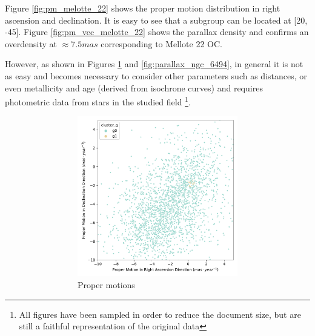 \documentclass[11pt, a4paper, english]{book}
\begin{document}
Figure \ref{fig:pm_melotte_22} shows the proper motion distribution in right ascension and declination.
It is easy to see that a subgroup can be located at [20, -45].
Figure \ref{fig:pm_vec_melotte_22} shows the parallax density and confirms an overdensity at $\approx 7.5 mas$ corresponding to Mellote 22 OC.

However, as shown in Figures \ref{fig:pm_ngc_6494} and \ref{fig:parallax_ngc_6494}, in general it is not as easy and
becomes necessary to consider other parameters such as distances, or even metallicity and age (derived from isochrone curves)
and requires photometric data from stars in the studied field
\footnote{All figures have been sampled in order to reduce the document size, but are still a faithful representation of the original data}.

\begin{figure}[htbp]
  \centering
  \begin{subfigure}{0.9\textwidth}
    \centering
    \begin{subfigure}[t]{0.45\textwidth}
      \centering
      \includegraphics[width=\textwidth]{../figures/pm_ngc_6494.pdf}
      \caption{Proper motions}
      \label{fig:pm_ngc_6494}
    \end{subfigure}
    \hfill
    \begin{subfigure}[t]{0.45\textwidth}
      \centering

\end{subfigure}
\end{subfigure}
\end{figure}
\end{document}
